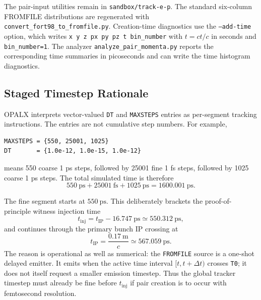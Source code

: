 \documentclass[11pt]{article}
\numberwithin{equation}{section}
\begin{document}
The pair-input utilities remain in \texttt{sandbox/track-e-p}.  The standard
six-column FROMFILE distributions are regenerated with
\texttt{convert\_fort98\_to\_fromfile.py}.  Creation-time diagnostics use the
\texttt{--add-time} option, which writes
\texttt{x y z px py pz t bin\_number} with \(t=ct/c\) in seconds and
\texttt{bin\_number=1}.  The analyzer
\texttt{analyze\_pair\_momenta.py} reports the corresponding time summaries in
picoseconds and can write the time histogram diagnostics.

\subsection{Staged Timestep Rationale}

OPALX interprets vector-valued \texttt{DT} and \texttt{MAXSTEPS} entries as
per-segment tracking instructions.  The entries are not cumulative step
numbers.  For example,
\begin{verbatim}
MAXSTEPS = {550, 25001, 1025}
DT       = {1.0e-12, 1.0e-15, 1.0e-12}
\end{verbatim}
means 550 coarse 1 ps steps, followed by 25001 fine 1 fs steps, followed by
1025 coarse 1 ps steps.  The total simulated time is therefore
\begin{equation}
  550~\mathrm{ps} + 25001~\mathrm{fs} + 1025~\mathrm{ps}
  = 1600.001~\mathrm{ps}.
\end{equation}

The fine segment starts at \(550~\mathrm{ps}\).  This deliberately brackets the
proof-of-principle witness injection time
\begin{equation}
  t_{\mathrm{inj}} =
  t_{\mathrm{IP}} - 16.747~\mathrm{ps}
  \simeq 550.312~\mathrm{ps},
\end{equation}
and continues through the primary bunch IP crossing at
\begin{equation}
  t_{\mathrm{IP}} = \frac{0.17~\mathrm{m}}{c}
  \simeq 567.059~\mathrm{ps}.
\end{equation}
The reason is operational as well as numerical: the \texttt{FROMFILE} source is
a one-shot delayed emitter.  It emits when the active time interval
\([t,t+\Delta t)\) crosses \texttt{T0}; it does not itself request a smaller
emission timestep.  Thus the global tracker timestep must already be fine
before \(t_{\mathrm{inj}}\) if pair creation is to occur with femtosecond
resolution.
\end{document}
